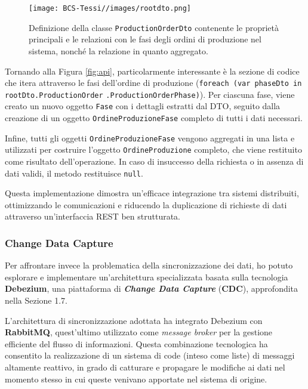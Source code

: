         \begin{figure}[H]
            \centering
            \texttt{[image: BCS-Tessi//images/rootdto.png]}
            \caption[Definizione della classe \texttt{ProductionOrderDto} e aggregati]{Definizione della classe \texttt{ProductionOrderDto} contenente le proprietà principali e le relazioni con le fasi degli ordini di produzione nel sistema, nonché la relazione in quanto aggregato. }
            \label{fig:rootdto}
        \end{figure}

        \vspace{0.2 em}
        \noindent Tornando alla Figura \ref{fig:api}, particolarmente interessante è la sezione di codice che itera attraverso le fasi dell'ordine di produzione (\texttt{foreach (var phaseDto in rootDto.ProductionOrder} \texttt{.ProductionOrderPhase)}). Per ciascuna fase, viene creato un nuovo oggetto \texttt{Fase} con i dettagli estratti dal DTO, seguito dalla creazione di un oggetto \texttt{OrdineProduzioneFase} completo di tutti i dati necessari.

        \vspace{0.2 em}
        \noindent Infine, tutti gli oggetti \texttt{OrdineProduzioneFase} vengono aggregati in una lista e utilizzati per costruire l'oggetto \texttt{OrdineProduzione} completo, che viene restituito come risultato dell'operazione. In caso di insuccesso della richiesta o in assenza di dati validi, il metodo restituisce \texttt{null}.

        \vspace{0.2 em}
        \noindent Questa implementazione dimostra un'efficace integrazione tra sistemi distribuiti, ottimizzando le comunicazioni e riducendo la duplicazione di richieste di dati attraverso un'interfaccia REST ben strutturata.

        \subsubsection{Change Data Capture}
        \vspace{0.2 em}
        \noindent Per affrontare invece la problematica della sincronizzazione dei dati, ho potuto esplorare e implementare un'architettura specializzata basata sulla tecnologia \textbf{Debezium}, una piattaforma di \textbf{\textit{Change Data Capture}} (\textbf{CDC}), approfondita nella Sezione 1.7. 

        \vspace{0.2 em}
        \noindent L'architettura di sincronizzazione adottata ha integrato Debezium con \textbf{RabbitMQ}, quest'ultimo utilizzato come \textit{message broker }per la gestione efficiente del flusso di informazioni. Questa combinazione tecnologica ha consentito la realizzazione di un sistema di code (inteso come liste) di messaggi altamente reattivo, in grado di catturare e propagare le modifiche ai dati nel momento stesso in cui queste venivano apportate nel sistema di origine.

